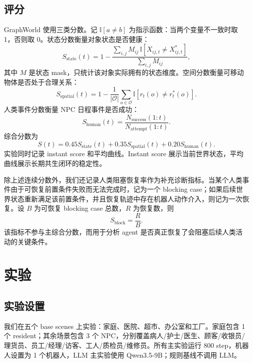 \documentclass[journal]{IEEEtran}
\begin{document}
\subsection{评分}
GraphWorld 使用三类分数。记 $\mathbb{I}[a \ne b]$ 为指示函数：当两个变量不一致时取 1，否则取 0。状态分数衡量对象状态是否健康：
\begin{equation}
S_{\mathrm{state}}(t) = 1 - \frac{\sum_{i,j} M_{ij}\, \mathbb{I}[X_{ij,t} \ne X^{*}_{ij,t}]}{\sum_{i,j} M_{ij}},
\end{equation}
其中 $M$ 是状态 mask，只统计该对象实际拥有的状态维度。空间分数衡量可移动物体是否处于合理关系：
\begin{equation}
S_{\mathrm{spatial}}(t) = 1 - \frac{1}{|\mathcal{O}|}\sum_{o\in \mathcal{O}} \mathbb{I}[r_t(o) \ne r^{*}_t(o)].
\end{equation}
人类事件分数衡量 NPC 日程事件是否成功：
\begin{equation}
S_{\mathrm{human}}(t) = \frac{N_{\mathrm{success}}(1:t)}{N_{\mathrm{attempt}}(1:t)}.
\end{equation}
综合分数为
\begin{equation}
S(t)=0.45S_{\mathrm{state}}(t)+0.35S_{\mathrm{spatial}}(t)+0.20S_{\mathrm{human}}(t).
\end{equation}
实验同时记录 instant score 和平均曲线。Instant score 展示当前世界状态，平均曲线展示长期共生闭环的稳定性。

除上述连续分数外，我们还记录人类阻塞恢复率作为补充诊断指标。当某个人类事件由于可恢复前置条件失败而无法完成时，记为一个 blocking case；如果后续世界状态重新满足该前置条件，并且恢复轨迹中存在机器人动作介入，则记为一次恢复。设 $B$ 为可恢复 blocking case 总数，$R$ 为恢复数，则
\begin{equation}
S_{\mathrm{block}} = \frac{R}{B}.
\end{equation}
该指标不参与主综合分数，而用于分析 agent 是否真正恢复了会阻塞后续人类活动的关键条件。

\section{实验}
\subsection{实验设置}
我们在五个 base scenes 上实验：家庭、医院、超市、办公室和工厂。家庭包含 1 个 resident；其余场景包含 3 个 NPC，分别覆盖病人/护士/医生、顾客/收银员/理货员、员工/经理/访客、工人/质检员/维修员。所有主实验运行 800 step，机器人设置为 1 个机器人，LLM 主实验使用 Qwen3.5-9B；规则基线不调用 LLM。
\end{document}
